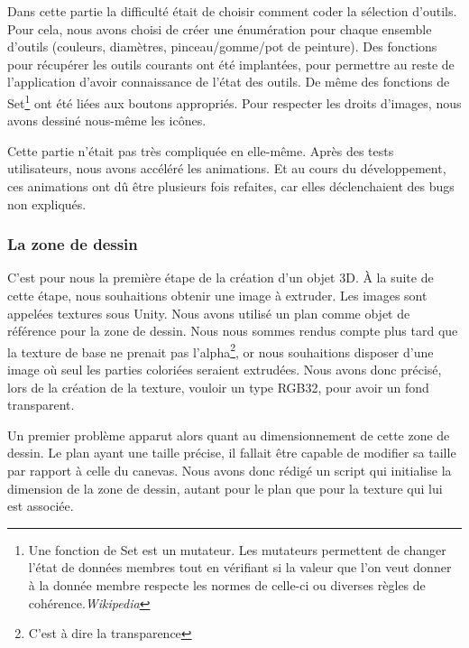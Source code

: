 \documentclass[a4paper,11pt]{article}
\begin{document}
				Dans cette partie la difficulté était de choisir comment coder la sélection d'outils. Pour cela, nous avons choisi de créer une énumération pour chaque ensemble d'outils (couleurs, diamètres, pinceau/gomme/pot de peinture). Des fonctions pour récupérer les outils courants ont été implantées, pour permettre au reste de l'application d'avoir connaissance de l'état des outils. De même des fonctions de Set\footnote{Une fonction de Set est un mutateur. Les mutateurs permettent de changer l'état de données membres tout en vérifiant si la valeur que l'on veut donner à la donnée membre respecte les normes de celle-ci ou diverses règles de cohérence.\emph{Wikipedia}} ont été liées aux boutons appropriés. Pour respecter les droits d'images, nous avons dessiné nous-même les icônes.
				
				Cette partie n'était pas très compliquée en elle-même. Après des tests utilisateurs, nous avons accéléré les animations. Et au cours du développement, ces animations ont dû être plusieurs fois refaites, car elles déclenchaient des bugs non expliqués.
			\subsubsection{La zone de dessin}
			
			C'est pour nous la première étape de la création d'un objet 3D. À la suite de cette étape, nous souhaitions obtenir une image à extruder. Les images sont appelées textures sous Unity. Nous avons utilisé un plan comme objet de référence pour la zone de dessin. Nous nous sommes rendus compte plus tard que la texture de base ne prenait pas l'alpha\footnote{C'est à dire la transparence}, or nous souhaitions disposer d'une image où seul les parties coloriées seraient extrudées. Nous avons donc précisé, lors de la création de la texture, vouloir un type RGB32, pour avoir un fond transparent.
			
			Un premier problème apparut alors quant au dimensionnement de cette zone de dessin. Le plan ayant une taille précise, il fallait être capable de modifier sa taille par rapport à celle du canevas. Nous avons donc rédigé un script qui initialise la dimension de la zone de dessin, autant pour le plan que pour la texture qui lui est associée.
			
\end{document}

